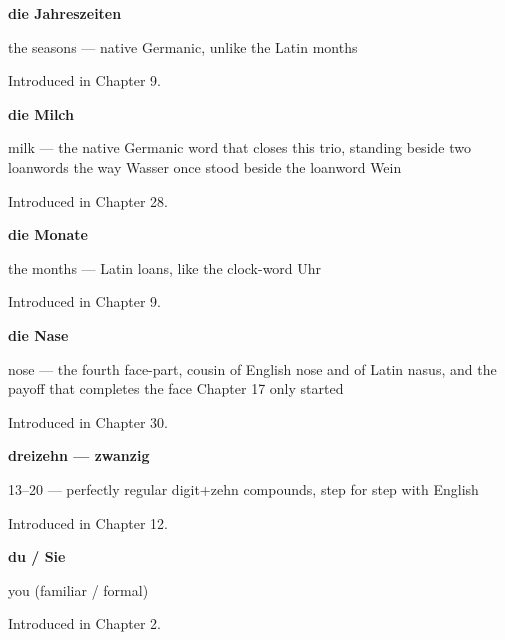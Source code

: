 \noindent\begin{minipage}[t]{\linewidth}
\raggedright
\textbf{die Jahreszeiten}\par
\small the seasons — native Germanic, unlike the Latin months\par
\footnotesize Introduced in Chapter 9.
\end{minipage}\par\medskip

\noindent\begin{minipage}[t]{\linewidth}
\raggedright
\textbf{die Milch}\par
\small milk — the native Germanic word that closes this trio, standing beside two loanwords the way Wasser once stood beside the loanword Wein\par
\footnotesize Introduced in Chapter 28.
\end{minipage}\par\medskip

\noindent\begin{minipage}[t]{\linewidth}
\raggedright
\textbf{die Monate}\par
\small the months — Latin loans, like the clock-word Uhr\par
\footnotesize Introduced in Chapter 9.
\end{minipage}\par\medskip

\noindent\begin{minipage}[t]{\linewidth}
\raggedright
\textbf{die Nase}\par
\small nose — the fourth face-part, cousin of English nose and of Latin nasus, and the payoff that completes the face Chapter 17 only started\par
\footnotesize Introduced in Chapter 30.
\end{minipage}\par\medskip

\noindent\begin{minipage}[t]{\linewidth}
\raggedright
\textbf{dreizehn — zwanzig}\par
\small 13–20 — perfectly regular digit+zehn compounds, step for step with English\par
\footnotesize Introduced in Chapter 12.
\end{minipage}\par\medskip

\noindent\begin{minipage}[t]{\linewidth}
\raggedright
\textbf{du / Sie}\par
\small you (familiar / formal)\par
\footnotesize Introduced in Chapter 2.
\end{minipage}\par\medskip


